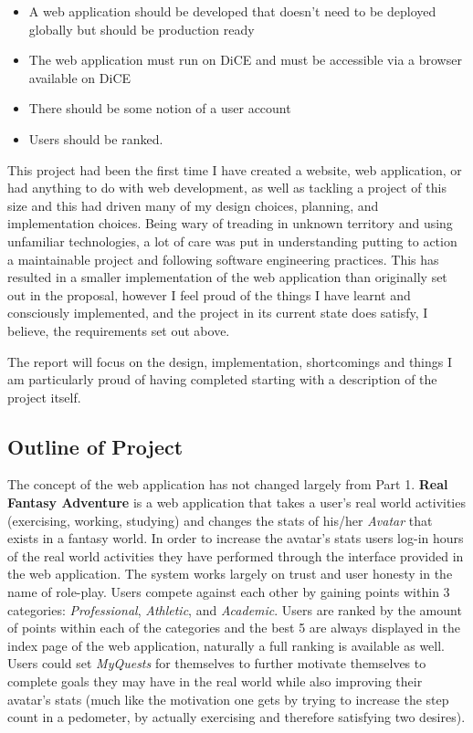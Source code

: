 \documentclass[11pt,a4paper]{article}
\begin{document}
\begin{itemize}
	\item A web application should be developed that doesn't need to be deployed globally but should be production ready
	\item The web application must run on DiCE and must be accessible via a browser available on DiCE
	\item There should be some notion of a user account
	\item Users should be ranked.
\end{itemize}

This project had been the first time I have created a website, web application, or had anything to do with web development, as well as tackling a project of this size and this had driven many of my design choices, planning, and implementation choices. Being wary of treading in unknown territory and using unfamiliar technologies, a lot of care was put in understanding putting to action a maintainable project and following software engineering practices. This has resulted in a smaller implementation of the web application than originally set out in the proposal, however I feel proud of the things I have learnt and consciously implemented, and the project in its current state does satisfy, I believe, the requirements set out above.

The report will focus on the design, implementation, shortcomings and things I am particularly proud of having completed starting with a description of the project itself.

\subsection{Outline of Project}
The concept of the web application has not changed largely from Part 1. \textbf{Real Fantasy Adventure} is a web application that takes a user's real world activities (exercising, working, studying) and changes the stats of his/her \textit{Avatar} that exists in a fantasy world. In order to increase the avatar's stats users log-in hours
of the real world activities they have performed through the interface provided in the web application. The system works largely on trust and user honesty in the name of role-play. Users compete against each other by gaining points within 3 categories: \textit{Professional}, \textit{Athletic}, and \textit{Academic}. Users are ranked by the amount of points within each of the categories and the best 5 are always displayed in the index page of the web application, naturally a full ranking is available as well. Users could set \textit{MyQuests} for themselves to further motivate themselves to complete goals they may have in the real world while also improving their avatar's stats (much like the motivation one gets by trying to increase the step count in a pedometer, by actually exercising and therefore satisfying two desires).
\end{document}
